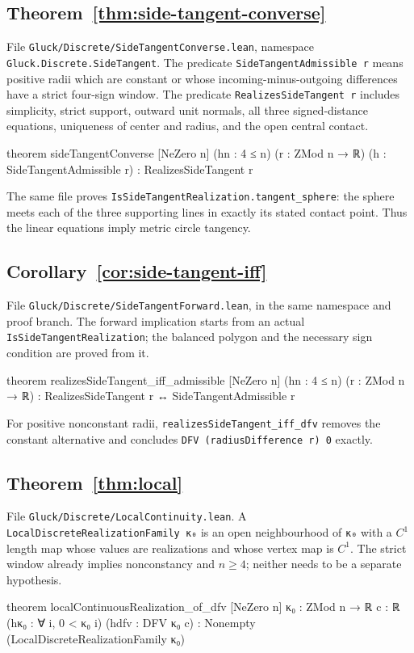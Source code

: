 \subsection*{Theorem~\ref{thm:side-tangent-converse}}
File \nolinkurl{Gluck/Discrete/SideTangentConverse.lean}, namespace
\texttt{Gluck.Discrete.SideTangent}. The predicate
\texttt{SideTangentAdmissible r} means positive radii which are constant
or whose incoming-minus-outgoing differences have a strict four-sign window.
The predicate \texttt{RealizesSideTangent r} includes simplicity, strict
support, outward unit normals, all three signed-distance equations,
uniqueness of center and radius, and the open central contact.
\begin{leancode}
theorem sideTangentConverse [NeZero n] (hn : 4 ≤ n)
    (r : ZMod n → ℝ) (h : SideTangentAdmissible r) :
    RealizesSideTangent r
\end{leancode}
The same file proves \texttt{IsSideTangentRealization.tangent\_sphere}:
the sphere meets each of the three supporting lines in exactly its stated
contact point. Thus the linear equations imply metric circle tangency.

\subsection*{Corollary~\ref{cor:side-tangent-iff}}
File \nolinkurl{Gluck/Discrete/SideTangentForward.lean}, in the same
namespace and proof branch. The forward implication starts from an actual
\texttt{IsSideTangentRealization}; the balanced polygon and the necessary
sign condition are proved from it.
\begin{leancode}
theorem realizesSideTangent_iff_admissible [NeZero n]
    (hn : 4 ≤ n) (r : ZMod n → ℝ) :
    RealizesSideTangent r ↔ SideTangentAdmissible r
\end{leancode}
For positive nonconstant radii, \texttt{realizesSideTangent\_iff\_dfv}
removes the constant alternative and concludes
\texttt{DFV (radiusDifference r) 0} exactly.

\subsection*{Theorem~\ref{thm:local}}
File \nolinkurl{Gluck/Discrete/LocalContinuity.lean}. A
\texttt{LocalDiscreteRealizationFamily κ₀} is an open neighbourhood of
\texttt{κ₀} with a $C^1$ length map whose values are realizations and whose
vertex map is $C^1$. The strict window already implies nonconstancy and
$n\ge4$; neither needs to be a separate hypothesis.
\begin{leancode}
theorem localContinuousRealization_of_dfv [NeZero n]
    {κ₀ : ZMod n → ℝ} {c : ℝ}
    (hκ₀ : ∀ i, 0 < κ₀ i) (hdfv : DFV κ₀ c) :
    Nonempty (LocalDiscreteRealizationFamily κ₀)
\end{leancode}

